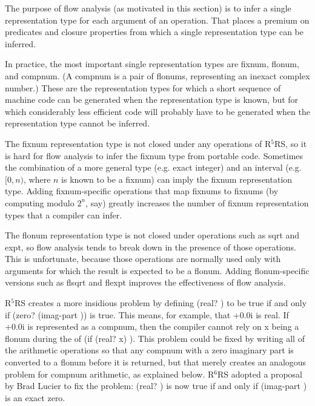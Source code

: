 \documentclass[twoside,twocolumn]{algol60}
\newcommand{\rn}[1]{R$^{#1}$RS}
\begin{document}
The purpose of flow analysis (as motivated in this section) is to infer a
single representation type for each argument of an operation.  That
places a premium on predicates and closure properties from which a
single representation type can be inferred.

In practice, the most important single representation types are
fixnum, flonum, and compnum.  (A compnum is a pair of flonums,
representing an inexact complex number.)  These are the representation
types for which a short sequence of machine code can be generated when
the representation type is known, but for which considerably less
efficient code will probably have to be generated when the
representation type cannot be inferred.

The fixnum representation type is not closed under any operations of
\rn{5}, so it is hard for flow analysis to infer the fixnum type from
portable code.  Sometimes the combination of a more general type (e.g.
exact integer) and an interval (e.g.  $[0,n)$, where $n$ is known to
be a fixnum) can imply the fixnum representation type.  Adding
fixnum-specific operations that map fixnums to fixnums (by computing
modulo $2^n$, say) greatly increases the number of fixnum
representation types that a compiler can infer.

The flonum representation type is not closed under operations such as
{\cf sqrt} and {\cf expt}, so flow analysis tends to break down in the
presence of those operations.  This is unfortunate, because those
operations are normally used only with arguments for which the result
is expected to be a flonum.  Adding flonum-specific versions such as
{\cf flsqrt} and {\cf flexpt} improves the effectiveness of flow
analysis.

\rn{5} creates a more insidious problem by defining {\cf (real?
  )} to be true if and only if {\cf (zero? (imag-part
  ))} is true.  This means, for example, that {+0.0i}
is real.  If {+0.0i} is represented as a compnum, then the
compiler cannot rely on x being a flonum during the 
of {\cf (if (real? x)  )}.  This
problem could be fixed by writing all of the arithmetic operations so
that any compnum with a zero imaginary part is converted to a flonum
before it is returned, but that merely creates an analogous problem
for compnum arithmetic, as explained below.  \rn{6} adopted a proposal
by Brad Lucier to fix the problem: {\cf (real? )} is now true
if and only if {\cf (imag-part )} is an exact zero.
\end{document}
